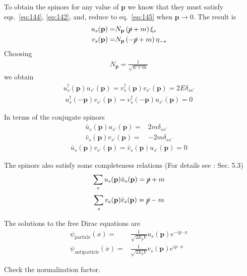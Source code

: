 To obtain the spinors for any value of $\mathbf{p}$ we know that they must satisfy eqs.~\eqref{eq:144}, \eqref{eq:142}, and, reduce to eq.~\eqref{eq:145} when $\mathbf{p}\to 0$. 
The result is
\begin{align}
  u_s(\mathbf{p})=&N_{\mathbf{p}}\left(\cancel{p}+m\right)\xi_s\nonumber\\
  v_s(\mathbf{p})=&N_{\mathbf{p}}\left(-\cancel{p}+m\right)\eta_{-s}
\end{align}
Choosing
\begin{align}
  N_{\mathbf{p}}=\frac{1}{\sqrt{E+m}}
\end{align}
we obtain
\begin{align}
  u_s^\dagger(\mathbf{p})u_{s'}(\mathbf{p})=v_s^\dagger(\mathbf{p})v_{s'}(\mathbf{p})=2E \delta_{s s'}
\end{align}
\begin{align}
  u_s^\dagger(-\mathbf{p})v_{s'}(\mathbf{p})=v_s^\dagger(-\mathbf{p})u_{s'}(\mathbf{p})=0
\end{align}

In terms of the conjugate spinors
\begin{align}
  \bar{u}_s(\mathbf{p})u_{s'}(\mathbf{p})=&2m \delta_{s s'}\nonumber\\
  \bar{v}_s(\mathbf{p})v_{s'}(\mathbf{p})=&-2m \delta_{s s'}
\end{align}
\begin{align}
  \bar{u}_s(\mathbf{p})v_{s'}(\mathbf{p})=\bar{v}_s(\mathbf{p})u_{s'}(\mathbf{p})=0
\end{align}


The spinors also satisfy some completeness relations (For details see \cite{physics/0703214}: Sec. 5.3)
\begin{align}
  \sum_s u_s(\mathbf{p})\bar{u}_s(\mathbf{p})=\cancel{p}+m
\end{align}
\begin{align}
  \sum_s v_s(\mathbf{p})\bar{v}_s(\mathbf{p})=\cancel{p}-m
\end{align}

The solutions to the free Dirac equations are
\begin{align}
  \psi_{\text{particle}}(x)=&\frac{1}{\sqrt{2E_p V}}u_s(\mathbf{p})e^{-i p\cdot x}\nonumber\\
  \psi_{\text{antiparticle}}(x)=&\frac{1}{\sqrt{2E_p V}}v_s(\mathbf{p})e^{i p\cdot x}
\end{align}
\begin{inprogress}
  Check the normalization factor.
\end{inprogress}

